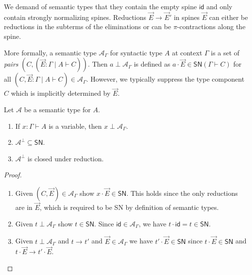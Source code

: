 \documentclass[a4paper,USenglish,cleveref, autoref, thm-restate]{lipics-v2019}
\newcommand{\bla}{\ensuremath{\mbox{$$}}}
\newcommand{\tid}{\mathsf{id}}
\newcommand{\red}[1][]{\longrightarrow_{#1}}
\newcommand{\A}{\mathcal{A}}
\newcommand{\SN}{\mathsf{SN}}
\begin{document}
We demand of semantic types that they contain the
empty spine $\tid$
and only contain strongly normalizing
spines.
Reductions $\vec E \red \vec E'$ in spines $\vec E$ can either be
reductions in the subterms of the eliminations or can be
$\pi$-contractions along the spine.

More formally, a semantic type $\A_\Gamma$ for syntactic type $A$ at
context $\Gamma$ is a set of \emph{pairs}
$(C, (\vec E : \Gamma \mid A \vdash C))$.
Then $a \perp \A_\Gamma$ is defined as
$a \cdot \vec E \in \SN(\Gamma \vdash C)$
for all $(C, \vec E : \Gamma \mid A \vdash C) \in \A_\Gamma$.
However, we typically
suppress the type component $C$ which is implicitly determined by
$\vec E$.
\begin{lemma}
  Let $\A$ be a semantic type for $A$.
  \begin{enumerate}
  \item If $x : \Gamma \vdash A$ is a variable, then $x \perp
    \A_\Gamma$.
  \item $\A^\perp \subseteq \SN$.
  \item $\A^\perp$ is closed under reduction.
  \end{enumerate}
\end{lemma}
\begin{proof} \bla
  \begin{enumerate}
  \item Given $(C, \vec E) \in \A_\Gamma$ show $x \cdot \vec E \in
    \SN$.  This holds since the only reductions are in $\vec E$, which
    is required to be SN by definition of semantic types.

  \item Given $t \perp \A_\Gamma$ show $t \in \SN$.
   Since $\tid \in \A_\Gamma$, we have $t \cdot \tid = t \in \SN$.

  \item Given $t \perp \A_\Gamma$ and $t \red t'$ and $\vec E \in \A_\Gamma$ we
    have $t' \cdot \vec E \in \SN$ since $t \cdot \vec E \in \SN$ and
    $t \cdot \vec E \red t' \cdot \vec E$.
  \popQED
  \end{enumerate}
\end{proof}
\end{document}
